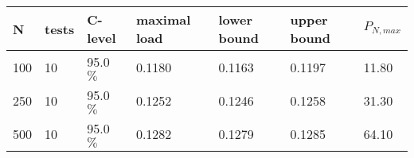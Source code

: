 \begin{table}[H] 
\centering 
\begin{tabular}{|l|l|l|l|l|l|l|} 
\hline 
N & tests & C-level & maximal load & lower bound & upper bound & $P_{N,max}$\\ 
 \hline \hline 
100 & 10 & 95.0 $ \% $& 0.1180 & 0.1163 & 0.1197 & 11.80 \\ 
250 & 10 & 95.0 $ \% $& 0.1252 & 0.1246 & 0.1258 & 31.30 \\ 
500 & 10 & 95.0 $ \% $& 0.1282 & 0.1279 & 0.1285 & 64.10 \\ 
\hline 
\end{tabular} 
\end{table} 
